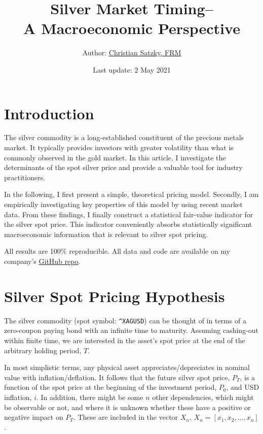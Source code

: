 \documentclass[
  12pt,
]{article}
\title{Silver Market Timing--\\
A Macroeconomic Perspective}
\author{Author: \href{https://www.linkedin.com/in/christian-satzky/}{Christian
Satzky, FRM}}
\date{Last update: 2 May 2021}
\begin{document}
\maketitle

\newpage
\hypersetup{linkcolor=black}
\tableofcontents
\newpage
\hypersetup{linkcolor=blue}

\hypertarget{introduction}{%
\section{Introduction}\label{introduction}}

The silver commodity is a long-established constituent of the precious
metals market. It typically provides investors with greater volatility
than what is commonly observed in the gold market. In this article, I
investigate the determinants of the spot silver price and provide a
valuable tool for industry practitioners.

In the following, I first present a simple, theoretical pricing model.
Secondly, I am empirically investigating key properties of this model by
using recent market data. From these findings, I finally construct a
statistical fair-value indicator for the silver spot price. This
indicator conveniently absorbs statistically significant macroeconomic
information that is relevant to silver spot pricing.

All results are 100\% reproducible. All data and code are available on
my company's
\href{https://github.com/sharelab/silver-market-timing}{GitHub repo}.

\hypertarget{silver-spot-pricing-hypothesis}{%
\section{Silver Spot Pricing
Hypothesis}\label{silver-spot-pricing-hypothesis}}

The silver commodity (spot symbol: \texttt{\^{}XAGUSD}) can be thought
of in terms of a zero-coupon paying bond with an infinite time to
maturity. Assuming cashing-out within finite time, we are interested in
the asset's spot price at the end of the arbitrary holding period,
\(T\).

In most simplistic terms, any physical asset appreciates/depreciates in
nominal value with inflation/deflation. It follows that the future
silver spot price, \(P_T\), is a function of the spot price at the
beginning of the investment period, \(P_0\), and USD inflation, \(i\).
In addition, there might be some \(n\) other dependencies, which might
be observable or not, and where it is unknown whether these have a
positive or negative impact on \(P_T\). These are included in the vector
\(X_n\), \(X_n = [x_1, x_2,..., x_n]\).
\end{document}
